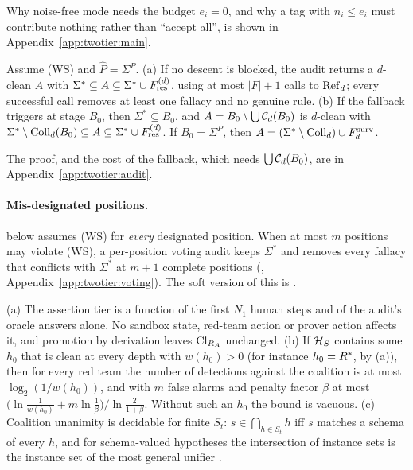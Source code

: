 Why noise-free mode needs the budget $e_i=0$, and why a tag with $n_i\le e_i$ must contribute nothing rather than ``accept all'', is shown in Appendix~\ref{app:twotier:main}.

\begin{lemma}\label{lem:twotier:audit}
Assume (WS) and $\hat P=\Sigma^P$.
\textup{(a)} If no descent is blocked, the audit returns a $d$-clean $A$ with $\Sigma^*\subseteq A\subseteq\Sigma^*\cup F^{(d)}_{\mathrm{res}}$, using at most $|F|+1$ calls to $\mathrm{Ref}_d$; every successful call removes at least one fallacy and no genuine rule.
\textup{(b)} If the fallback triggers at stage $B_0$, then $\Sigma^*\subseteq B_0$, and $A=B_0\setminus\bigcup\mathcal{C}_d(B_0)$ is $d$-clean with
$\Sigma^*\setminus\mathrm{Coll}_d(B_0)\subseteq A\subseteq\Sigma^*\cup F^{(d)}_{\mathrm{res}}$. If $B_0=\Sigma^P$, then $A=(\Sigma^*\setminus\mathrm{Coll}_d)\cup F^{\mathrm{surv}}_{d}$.
\end{lemma}

The proof, and the cost of the fallback, which needs $\bigcup\mathcal{C}_d(B_0)$, are in Appendix~\ref{app:twotier:audit}.

\paragraph{Mis-designated positions.}  below assumes (WS) for \emph{every} designated position. When at most $m$ positions may violate (WS), a per-position voting audit keeps $\Sigma^*$ and removes every fallacy that conflicts with $\Sigma^*$ at $m+1$ complete positions (, Appendix~\ref{app:twotier:voting}). The soft version of this is .

\begin{proposition}\label{prop:twotier:sandbox}
\textup{(a)} The assertion tier is a function of the first $N_1$ human steps and of the audit's oracle answers alone. No sandbox state, red-team action or prover action affects it, and promotion by derivation leaves $\mathrm{Cl}_{R_A}$ unchanged.
\textup{(b)} If $\mathcal{H}_S$ contains some $h_0$ that is clean at every depth with $w(h_0)>0$ (for instance $h_0=R^{*}$, by (a)), then for every red team the number of detections against the coalition is at most $\log_2(1/w(h_0))$, and with $m$ false alarms and penalty factor $\beta$ at most $\bigl(\ln\frac1{w(h_0)}+m\ln\frac1\beta\bigr)/\ln\frac2{1+\beta}$. Without such an $h_0$ the bound is vacuous.
\textup{(c)} Coalition unanimity is decidable for finite $S_t$: $s\in\bigcap_{h\in S_t}h$ iff $s$ matches a schema of every $h$, and for schema-valued hypotheses the intersection of instance sets is the instance set of the most general unifier \citep{robinson1965machine,plotkin1970note,reynolds1970transformational}.
\end{proposition}

